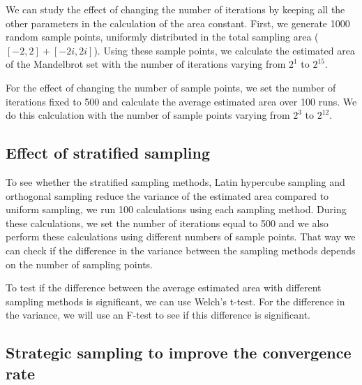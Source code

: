 \documentclass{uva-inf-article}
\begin{document}
We can study the effect of changing the number of iterations by keeping all the other parameters in the calculation of the area constant. First, we generate 1000 random sample points, uniformly distributed in the total sampling area (${[-2,2] +[-2i,2i]}$).
Using these sample points, we calculate the estimated area of the Mandelbrot set with the number of iterations varying from $2^1$ to $2^{15}$.

For the effect of changing the number of sample points, we set the number of iterations fixed to 500 and calculate the average estimated area over 100 runs.
We do this calculation with the number of sample points varying from $2^3$ to $2^{12}$.

\subsection{Effect of stratified sampling}

To see whether the stratified sampling methods, Latin hypercube sampling and orthogonal sampling reduce the variance of the estimated area compared to uniform sampling, we run 100 calculations using each sampling method.
During these calculations, we set the number of iterations equal to 500 and we also perform these calculations using different numbers of sample points. That way we can check if the difference in the variance between the sampling methods depends on the number of sampling points.

To test if the difference between the average estimated area with different sampling methods is significant, we can use Welch's t-test. For the difference in the variance, we will use an F-test to see if this difference is significant.

\subsection{Strategic sampling to improve the convergence rate}
\end{document}
